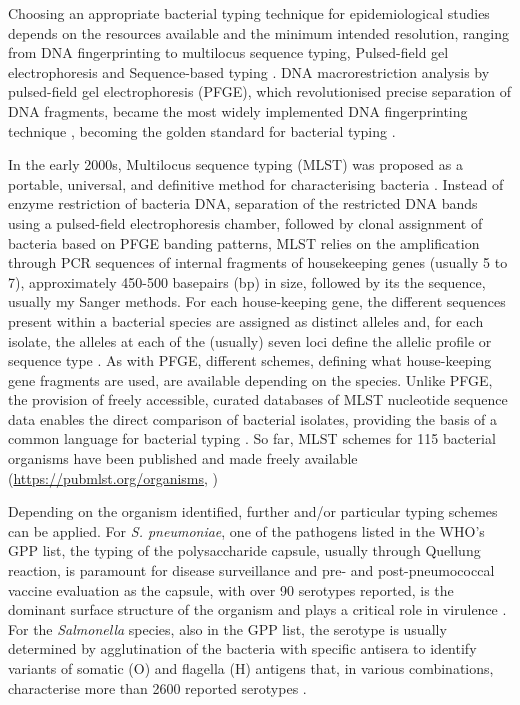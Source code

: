 Choosing an appropriate bacterial typing technique for epidemiological studies depends on the resources available and the minimum intended resolution, ranging from DNA fingerprinting to multilocus sequence typing, Pulsed-field gel electrophoresis and Sequence-based typing \citep{allerberger_molecular_2012,foxman_choosing_2005}. DNA macrorestriction analysis by pulsed-field gel electrophoresis (PFGE), which revolutionised precise separation of DNA fragments, became the most widely implemented DNA fingerprinting technique \citep{allerberger_molecular_2012}, becoming the golden standard for bacterial typing \citep{neoh_pulsed-field_2019}.

In the early 2000s, Multilocus sequence typing (MLST) was proposed as a portable, universal, and definitive method for characterising bacteria \citep{maiden_multilocus_2006}. Instead of enzyme restriction of bacteria DNA, separation of the restricted DNA bands using a pulsed-field electrophoresis chamber, followed by clonal assignment of bacteria based on PFGE banding patterns, MLST relies on the amplification through PCR sequences of internal fragments of housekeeping genes (usually 5 to 7), approximately 450-500 basepairs (bp) in size, followed by its the sequence, usually my Sanger methods. For each house-keeping gene, the different sequences present within a bacterial species are assigned as distinct alleles and, for each isolate, the alleles at each of the (usually) seven loci define the allelic profile or sequence type \citep{larsen_multilocus_2012}. As with PFGE, different schemes, defining what house-keeping gene fragments are used, are available depending on the species. Unlike PFGE, the provision of freely accessible, curated databases of MLST nucleotide sequence data enables the direct comparison of bacterial isolates, providing the basis of a common language for bacterial typing \citep{maiden_multilocus_2006}. So far, MLST schemes for 115 bacterial organisms have been published and made freely available (\url{https://pubmlst.org/organisms}, \cite{jolley_open-access_2018}) 

Depending on the organism identified, further and/or particular typing schemes can be applied. For \textit{S. pneumoniae}, one of the pathogens listed in the WHO's GPP list, the typing of the polysaccharide capsule, usually through Quellung reaction, is paramount for disease surveillance and pre- and post-pneumococcal vaccine evaluation as the capsule, with over 90 serotypes reported, is the dominant surface structure of the organism and plays a critical role in virulence \citep{jauneikaite_current_2015, paton_streptococcus_2019}. For the \textit{Salmonella} species, also in the GPP list, the serotype is usually determined by agglutination of the bacteria with specific antisera to identify variants of somatic (O) and flagella (H) antigens that, in various combinations, characterise more than 2600 reported serotypes \citep{diep_salmonella_2019}. 

